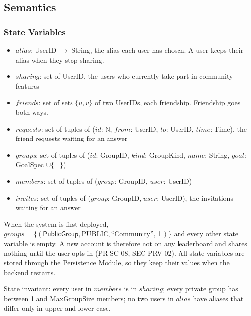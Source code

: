 \documentclass[12pt, titlepage]{article}
\begin{document}
\subsection{Semantics}

\subsubsection{State Variables}

\begin{itemize}
\item $\mathit{alias}$: UserID $\rightarrow$ String, the alias each user has
  chosen. A user keeps their alias when they stop sharing.
\item $\mathit{sharing}$: set of UserID, the users who currently take part
  in community features
\item $\mathit{friends}$: set of sets $\{u, v\}$ of two UserIDs, each
  friendship. Friendship goes both ways.
\item $\mathit{requests}$: set of tuples of ($\mathit{id}$: $\mathbb{N}$,
  $\mathit{from}$: UserID, $\mathit{to}$: UserID, $\mathit{time}$: Time),
  the friend requests waiting for an answer
\item $\mathit{groups}$: set of tuples of ($\mathit{id}$: GroupID,
  $\mathit{kind}$: GroupKind, $\mathit{name}$: String, $\mathit{goal}$:
  GoalSpec $\cup \{\bot\}$)
\item $\mathit{members}$: set of tuples of ($\mathit{group}$: GroupID,
  $\mathit{user}$: UserID)
\item $\mathit{invites}$: set of tuples of ($\mathit{group}$: GroupID,
  $\mathit{user}$: UserID), the invitations waiting for an answer
\end{itemize}

\noindent When the system is first deployed, $\mathit{groups} =
\{(\textsf{PublicGroup}, \mathrm{PUBLIC}, \text{``Community''}, \bot)\}$
and every other state variable is empty. A new account is therefore not on
any leaderboard and shares nothing until the user opts in (PR-SC-08,
SEC-PRV-02). All state variables are stored through the Persistence Module,
so they keep their values when the backend restarts.

\medskip

\noindent State invariant: every user in $\mathit{members}$ is in
$\mathit{sharing}$; every private group has between 1 and
\textsf{MaxGroupSize} members; no two users in $\mathit{alias}$ have
aliases that differ only in upper and lower case.
\end{document}
